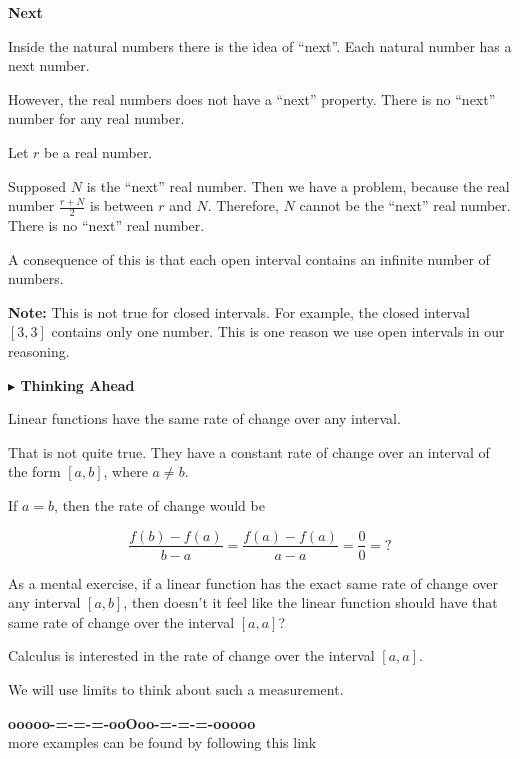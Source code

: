 \documentclass{ximera}
\begin{document}
\begin{idea} \textbf{\textcolor{blue!55!black}{Next}}



Inside the natural numbers there is the idea of ``next''.  Each natural number has a next number. 


However, the real numbers does not have a ``next'' property.  There is no ``next'' number for any real number.


Let $r$ be a real number. 

Supposed $N$ is the ``next'' real number.  Then we have a problem, because the real number $\frac{r+N}{2}$ is between $r$ and $N$.  Therefore, $N$ cannot be the ``next'' real number.  There is no ``next'' real number. 


A consequence of this is that each open interval contains an infinite number of numbers. 



\textbf{Note: } This is not true for closed intervals.  For example, the closed interval $[3, 3]$ contains only one number.  This is one reason we use open intervals in our reasoning.



\end{idea}





\textbf{\textcolor{red!70!black}{$\blacktriangleright$ Thinking Ahead}} 


Linear functions have the same rate of change over any interval. 

That is not quite true.  They have a constant rate of change over an interval of the form $[a, b]$, where $a \ne b$. 


If $ a = b$, then the rate of change would be 

\[
\frac{f(b)-f(a)}{b-a} = \frac{f(a)-f(a)}{a-a} = \frac{0}{0} = ?
\]

As a mental exercise, if a linear function has the exact same rate of change over any interval $[a, b]$, then doesn't it feel like the linear function should have that same rate of change over the interval $[a, a]$? 



Calculus is interested in the rate of change over the interval $[a,a]$.

We will use limits to think about such a measurement.






\begin{center}
\textbf{\textcolor{green!50!black}{ooooo-=-=-=-ooOoo-=-=-=-ooooo}} \\

more examples can be found by following this link\\ 

\end{center}
\end{document}
